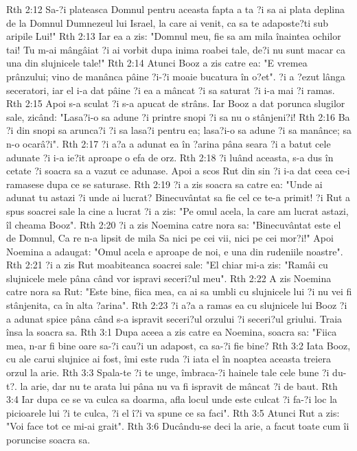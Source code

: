 Rth 2:12  Sa-?i plateasca Domnul pentru aceasta fapta a ta ?i sa ai plata deplina de la Domnul Dumnezeul lui Israel, la care ai venit, ca sa te adaposte?ti sub aripile Lui!"
Rth 2:13  Iar ea a zis: "Domnul meu, fie sa am mila înaintea ochilor tai! Tu m-ai mângâiat ?i ai vorbit dupa inima roabei tale, de?i nu sunt macar ca una din slujnicele tale!"
Rth 2:14  Atunci Booz a zis catre ea: "E vremea prânzului; vino de manânca pâine ?i-?i moaie bucatura în o?et". ?i a ?ezut lânga seceratori, iar el i-a dat pâine ?i ea a mâncat ?i sa saturat ?i i-a mai ?i ramas.
Rth 2:15  Apoi s-a sculat ?i s-a apucat de strâns. Iar Booz a dat porunca slugilor sale, zicând: "Lasa?i-o sa adune ?i printre snopi ?i sa nu o stânjeni?i!
Rth 2:16  Ba ?i din snopi sa arunca?i ?i sa lasa?i pentru ea; lasa?i-o sa adune ?i sa manânce; sa n-o ocarâ?i".
Rth 2:17  ?i a?a a adunat ea în ?arina pâna seara ?i a batut cele adunate ?i i-a ie?it aproape o efa de orz.
Rth 2:18  ?i luând aceasta, s-a dus în cetate ?i soacra sa a vazut ce adunase. Apoi a scos Rut din sin ?i i-a dat ceea ce-i ramasese dupa ce se saturase.
Rth 2:19  ?i a zis soacra sa catre ea: "Unde ai adunat tu astazi ?i unde ai lucrat? Binecuvântat sa fie cel ce te-a primit! ?i Rut a spus soacrei sale la cine a lucrat ?i a zis: "Pe omul acela, la care am lucrat astazi, îl cheama Booz".
Rth 2:20  ?i a zis Noemina catre nora sa: "Binecuvântat este el de Domnul, Ca re n-a lipsit de mila Sa nici pe cei vii, nici pe cei mor?i!" Apoi Noemina a adaugat: "Omul acela e aproape de noi, e una din rudeniile noastre".
Rth 2:21  ?i a zis Rut moabiteanca soacrei sale: "El chiar mi-a zis: "Ramâi cu slujnicele mele pâna când vor ispravi seceri?ul meu".
Rth 2:22  A zis Noemina catre nora sa Rut: "Este bine, fiica mea, ca ai sa umbli cu slujnicele lui ?i nu vei fi stânjenita, ca în alta ?arina".
Rth 2:23  ?i a?a a ramas ea cu slujnicele lui Booz ?i a adunat spice pâna când s-a ispravit seceri?ul orzului ?i seceri?ul griului. Traia însa la soacra sa.
Rth 3:1  Dupa aceea a zis catre ea Noemina, soacra sa: "Fiica mea, n-ar fi bine oare sa-?i cau?i un adapost, ca sa-?i fie bine?
Rth 3:2  Iata Booz, cu ale carui slujnice ai fost, îmi este ruda ?i iata el în noaptea aceasta treiera orzul la arie.
Rth 3:3  Spala-te ?i te unge, îmbraca-?i hainele tale cele bune ?i du-t?. la arie, dar nu te arata lui pâna nu va fi ispravit de mâncat ?i de baut.
Rth 3:4  Iar dupa ce se va culca sa doarma, afla locul unde este culcat ?i fa-?i loc la picioarele lui ?i te culca, ?i el î?i va spune ce sa faci".
Rth 3:5  Atunci Rut a zis: "Voi face tot ce mi-ai grait".
Rth 3:6  Ducându-se deci la arie, a facut toate cum îi poruncise soacra sa.
